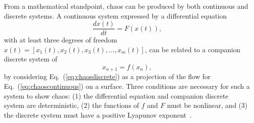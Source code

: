 \documentclass[prodmode,acmtaco,pdftex]{acmsmall}
\newcommand{\equationname}{Eq.}
\begin{document}
From a mathematical standpoint, chaos can be produced by both continuous
and discrete systems.  A continuous system expressed by a differential
equation
\begin{equation}
  \label{eq:chaoscontinuous}
  \dfrac{dx(t)}{dt} = F(x(t)),
\end{equation}
with at least three degrees of freedom
$x(t)=[x_{1}(t),x_{2}(t),x_{3}(t),\ldots, x_{m}(t)]$,
can be related to a companion discrete system of
\begin{equation}
  \label{eq:chaosdiscrete}
  x_{n+1}=f(x_{n}),
\end{equation}
by considering \equationname~(\ref{eq:chaosdiscrete}) as a projection of
the flow for \equationname~(\ref{eq:chaoscontinuous}) on a surface.
Three conditions are necessary for such a system to show chaos: (1) the
differential equation and companion discrete system are
deterministic, (2) the functions of $f$ and $F$ must be nonlinear, and (3) the
discrete system must have a positive Lyapunov exponent~\cite{Liu2010}.
\end{document}
